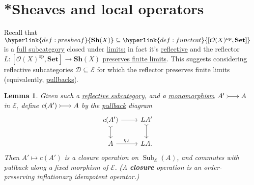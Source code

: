 \documentclass{article}
\makeatletter
\DeclareMathOperator{\Sub}{Sub}
\newcommand{\bonusnamed}[1]{\textbf{#1}\index{#1@*#1}}
\newenvironment{tikzcdi}{\begin{tikzcd}[cramped, sep=scriptsize]}{\end{tikzcd}}
\let\to\longrightarrow
\let\mapsto\longmapsto
\newtheorem{nlemma}[nthm]{Lemma}
\makeatother
\begin{document}
\section*{*Sheaves and local operators}
Recall that $\hyperlink{def:presheaf}{\mathbf{Sh}(X)} \subseteq \hyperlink{def:functcat}{[\mathcal{O}(X)^{\text{op}}, \mathbf{Set}]}$ is a \hyperlink{def:fulls}{full subcategory} closed under \hyperlink{def:limit}{limits:} in fact it's \hyperlink{def:refl}{reflective} and the reflector $L: [\mathcal{O}(X)^{\text{op}}, \mathbf{Set}] \to \mathbf{Sh}(X)$ \hyperlink{def:plim}{preserves finite limits}.
This suggests considering reflective subcategories $\mathscr{D} \subseteq \mathscr{E}$ for which the reflector preserves finite limits (equivalently, \hyperlink{def:pullback}{pullbacks}).
\begin{nlemma}\label{lem:7.15}
  Given such a \hyperlink{def:refl}{reflective subcategory}, and a \hyperlink{def:monic}{monomorphism} $\begin{tikzcdi} A' \rar[tail] & A \end{tikzcdi}$ in $\mathscr{E}$, define $\begin{tikzcdi} c(A') \rar[tail] & A \end{tikzcdi}$ by the \hyperlink{def:pullback}{pullback} diagram
  \begin{equation*}
  \begin{tikzcd}
    c(A') \rar \dar[tail] & LA' \dar[tail] \\
    A \rar{\eta_A} & LA.
  \end{tikzcd}
  \end{equation*}
  Then $A' \mapsto c(A')$ is a closure operation on $\Sub_\mathscr{E}(A)$, and commutes with pullback along a fixed morphism of $\mathscr{E}$.
  (A \hypertarget{def:closure}{\bonusnamed{closure}} operation is an order-preserving inflationary idempotent operator.)
\end{nlemma}
\end{document}
